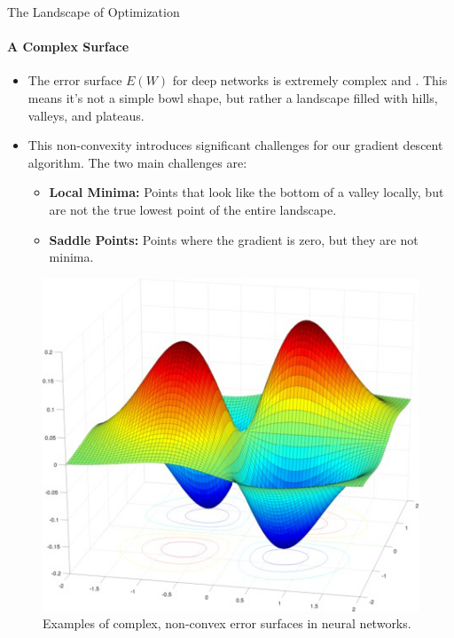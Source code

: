 \begin{frame}{The Landscape of Optimization}
    \framesubtitle{A Complex Surface}
    \begin{itemize}
        \item The error surface $E(W)$ for deep networks is extremely complex and . This means it's not a simple bowl shape, but rather a landscape filled with hills, valleys, and plateaus.
        \item This non-convexity introduces significant challenges for our gradient descent algorithm. The two main challenges are:
        \begin{itemize}
            \item \textbf{Local Minima:} Points that look like the bottom of a valley locally, but are not the true lowest point of the entire landscape.
            \item \textbf{Saddle Points:} Points where the gradient is zero, but they are not minima.
        \end{itemize}
    \end{itemize}
    \begin{figure}
        \centering
        \includegraphics[width=0.5\linewidth]{images/error_surfaces.png}
        \caption{Examples of complex, non-convex error surfaces in neural networks.}
    \end{figure}
\end{frame}

